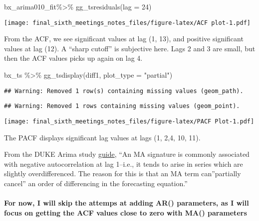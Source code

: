 \documentclass[
]{article}
\newenvironment{Shaded}{\begin{snugshade}}{\end{snugshade}}
\newcommand{\AttributeTok}[1]{\textcolor[rgb]{0.77,0.63,0.00}{#1}}
\newcommand{\DecValTok}[1]{\textcolor[rgb]{0.00,0.00,0.81}{#1}}
\newcommand{\FunctionTok}[1]{\textcolor[rgb]{0.00,0.00,0.00}{#1}}
\newcommand{\NormalTok}[1]{#1}
\newcommand{\SpecialCharTok}[1]{\textcolor[rgb]{0.00,0.00,0.00}{#1}}
\newcommand{\StringTok}[1]{\textcolor[rgb]{0.31,0.60,0.02}{#1}}
\begin{document}
\begin{Shaded}
\begin{Highlighting}[]
\NormalTok{bx\_arima010\_fit}\SpecialCharTok{\%\textgreater{}\%} \FunctionTok{gg\_tsresiduals}\NormalTok{(}\AttributeTok{lag =} \DecValTok{24}\NormalTok{)}
\end{Highlighting}
\end{Shaded}

\texttt{[image: final\_sixth\_meetings\_notes\_files/figure-latex/ACF plot-1.pdf]}

From the ACF, we see significant values at lag (1, 13), and positive
significant values at lag (12). A ``sharp cutoff'' is subjective here.
Lags 2 and 3 are small, but then the ACF values picks up again on lag 4.

\begin{Shaded}
\begin{Highlighting}[]
\NormalTok{bx\_ts }\SpecialCharTok{\%\textgreater{}\%} \FunctionTok{gg\_tsdisplay}\NormalTok{(diff1, }\AttributeTok{plot\_type =} \StringTok{"partial"}\NormalTok{)}
\end{Highlighting}
\end{Shaded}

\begin{verbatim}
## Warning: Removed 1 row(s) containing missing values (geom_path).
\end{verbatim}

\begin{verbatim}
## Warning: Removed 1 rows containing missing values (geom_point).
\end{verbatim}

\texttt{[image: final\_sixth\_meetings\_notes\_files/figure-latex/PACF Plot-1.pdf]}

The PACF displays significant lag values at lags (1, 2,4, 10, 11).

From the DUKE Arima study
\href{https://people.duke.edu/~rnau/411arim3.htm}{guide}, ``An MA
signature is commonly associated with negative autocorrelation at lag
1--i.e., it tends to arise in series which are slightly overdifferenced.
The reason for this is that an MA term can''partially cancel'' an order
of differencing in the forecasting equation.''

\hypertarget{for-now-i-will-skip-the-attemps-at-adding-ar-parameters-as-i-will-focus-on-getting-the-acf-values-close-to-zero-with-ma-parameters}{%
\paragraph{For now, I will skip the attemps at adding AR() parameters,
as I will focus on getting the ACF values close to zero with MA()
parameters}\label{for-now-i-will-skip-the-attemps-at-adding-ar-parameters-as-i-will-focus-on-getting-the-acf-values-close-to-zero-with-ma-parameters}}
\end{document}
